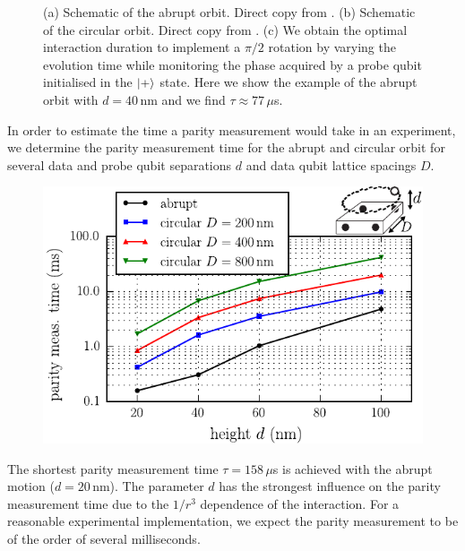 \begin{figure}[H]
	\caption{(a) Schematic of the abrupt orbit. Direct copy from \cite{OGorman2016}. (b) Schematic of the circular orbit. Direct copy from \cite{OGorman2016}. (c) We obtain the optimal interaction duration to implement a $\pi/2$ rotation by varying the evolution time while monitoring the phase acquired by a probe qubit initialised in the $\ket{+}$ state. Here we show the example of the abrupt orbit with $d=40\, $nm and we find $\tau\approx 77\, \mu$s.}
	\label{FIG:abrupt_tau}
\end{figure}

In order to estimate the time a parity measurement would take in an experiment, we determine the parity measurement time for the abrupt and circular orbit for several data and probe qubit separations $d$ and data qubit lattice spacings $D$.

\begin{figure}[H]
	\includegraphics[width=\linewidth]{../Figures/tau_d_D}
	\caption{}
	\label{FIG:tau}
\end{figure}

The shortest parity measurement time $\tau=158\, \mu$s is achieved with the abrupt motion ($d=20\, $nm).
The parameter $d$ has the strongest influence on the parity measurement time due to the $1/r^3$ dependence of the interaction.
For a reasonable experimental implementation, we expect the parity measurement to be of the order of several milliseconds.

 
